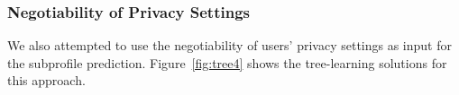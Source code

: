 \subsubsection{Negotiability of Privacy Settings}

We also attempted to use the negotiability of users' privacy settings as input for the subprofile prediction. Figure~\ref{fig:tree4} shows the tree-learning solutions for this approach.

%	
